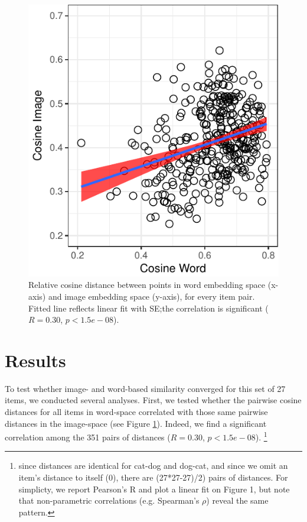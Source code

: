 \documentclass[10pt, letterpaper]{article}
\newenvironment{CodeChunk}{}{}
\begin{document}
\begin{CodeChunk}
\begin{figure}[tb]
\includegraphics{figs/pairwise-corr-1} \caption[Relative cosine distance between points in word embedding space (x-axis) and image embedding space (y-axis), for every item pair]{Relative cosine distance between points in word embedding space (x-axis) and image embedding space (y-axis), for every item pair. Fitted line reflects linear fit with SE;the correlation is significant ($R = 0.30$, $p < 1.5e-08$).}\label{fig:pairwise-corr}
\end{figure}
\end{CodeChunk}

\section{Results}\label{results}

To test whether image- and word-based similarity converged for this set
of 27 items, we conducted several analyses. First, we tested whether the
pairwise cosine distances for all items in word-space correlated with
those same pairwise distances in the image-space (see Figure
\ref{fig:pairwise-corr}). Indeed, we find a significant correlation
among the 351 pairs of distances (\(R = 0.30\), \(p < 1.5e-08\)).
\footnote{since distances are identical for cat-dog and dog-cat, and since we omit an item's distance to itself (0), there are (27*27-27)/2) pairs of distances. For simplicty, we report Pearson's R and plot a linear fit on Figure 1, but note that non-parametric correlations (e.g. Spearman's $\rho$) reveal the same pattern.}
\end{document}
